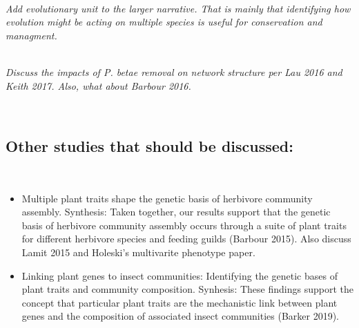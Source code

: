 \documentclass[11pt,twocolumn,twoside,lineno]{pnas-new}
\begin{document}
\\

\textit{Add evolutionary unit to the larger narrative. That is mainly
  that identifying how evolution might be acting on multiple species
  is useful for conservation and managment.}

\\

\textit{Discuss the impacts of P. betae removal on network structure
  per Lau 2016 and Keith 2017. Also, what about Barbour 2016.}

\\

\subsection*{Other studies that should be discussed:}

\\

\begin{itemize}
\item Multiple plant traits shape the genetic basis of herbivore
  community assembly. Synthesis: Taken together, our results support
  that the genetic basis of herbivore community assembly occurs
  through a suite of plant traits for different herbivore species and
  feeding guilds (Barbour 2015). Also discuss Lamit 2015 and Holeski's
  multivarite phenotype paper.
\item Linking plant genes to insect communities:  Identifying the
  genetic bases of plant traits and community composition. Synhesis:
  These findings support the concept that particular plant traits are
  the mechanistic link between plant genes and the composition of
  associated insect communities (Barker 2019).
\end{itemize}



\end{document}
